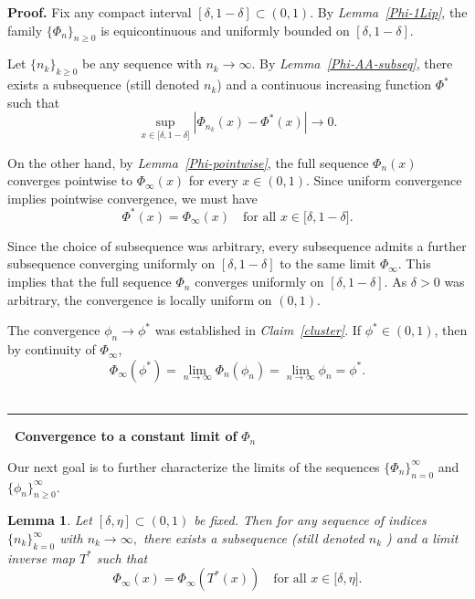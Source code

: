 \documentclass[onecolumn]{article}
\newtheorem{lemma}[theorem]{Lemma}
\newenvironment{proof}[1][Proof]{\noindent\textbf{#1.} }{\ \rule{0.5em}{0.5em}}
\begin{document}
\begin{proof}
Fix any compact interval $[\delta ,1-\delta ]\subset (0,1)$. By \textit{%
Lemma~\ref{Phi-1Lip}}, the family $\{\Phi _{n}\}_{n\geq 0}$ is
equicontinuous and uniformly bounded on $[\delta ,1-\delta ]$.

Let $\{n_{k}\}_{k\geq 0}$ be any sequence with $n_{k}\rightarrow \infty $.
By \textit{Lemma~\ref{Phi-AA-subseq}}, there exists a subsequence (still
denoted $n_{k}$) and a continuous increasing function $\Phi ^{\ast }$ such
that 
\begin{equation}
\sup_{x\in \lbrack \delta ,1-\delta ]}|\Phi _{n_{k}}(x)-\Phi ^{\ast
}(x)|\rightarrow 0.  \label{875n}
\end{equation}

On the other hand, by \textit{Lemma~\ref{Phi-pointwise}}, the full sequence $%
\Phi _{n}(x)$ converges pointwise to $\Phi _{\infty }(x)$ for every $x\in
(0,1)$. Since uniform convergence implies pointwise convergence, we must
have 
\begin{equation}
\Phi ^{\ast }(x)=\Phi _{\infty }(x)\quad \text{for all }x\in \lbrack \delta
,1-\delta ].  \label{875m}
\end{equation}

Since the choice of subsequence was arbitrary, every subsequence admits a
further subsequence converging uniformly on $[\delta ,1-\delta ]$ to the
same limit $\Phi _{\infty }$. This implies that the full sequence $\Phi _{n}$
converges uniformly on $[\delta ,1-\delta ]$. As $\delta >0$ was arbitrary,
the convergence is locally uniform on $(0,1)$.

The convergence $\phi _{n}\rightarrow \phi ^{\ast }$ was established in 
\textit{Claim~\ref{cluster}}. If $\phi ^{\ast }\in (0,1)$, then by
continuity of $\Phi _{\infty }$, 
\begin{equation}
\Phi _{\infty }(\phi ^{\ast })=\lim_{n\rightarrow \infty }\Phi _{n}(\phi
_{n})=\lim_{n\rightarrow \infty }\phi _{n}=\phi ^{\ast }.  \label{876p}
\end{equation}
\end{proof}

\begin{flushleft}
\textbf{\ Convergence to a constant limit of }$\Phi _{n}$\textbf{\ }
\end{flushleft}

\noindent Our next goal is to further characterize the limits of the
sequences $\{\Phi _{n}\}_{n=0}^{\infty }$ and $\{\phi _{n}\}_{n\geq
0}^{\infty }$.

\begin{lemma}
\noindent \label{Phi-eq} Let $[\delta ,\eta ]\subset (0,1)$ be fixed. Then
for any sequence of indices $\{n_{k}\}_{k=0}^{\infty }$ with $%
n_{k}\rightarrow \infty ,$ there exists a subsequence (still denoted $n_{k}$%
) and a limit inverse map $T^{\ast }$ such that 
\begin{equation}
\Phi _{\infty }(x)=\Phi _{\infty }(T^{\ast }(x))\quad \text{for all }x\in
\lbrack \delta ,\eta ].  \label{583}
\end{equation}
\end{lemma}
\end{document}
